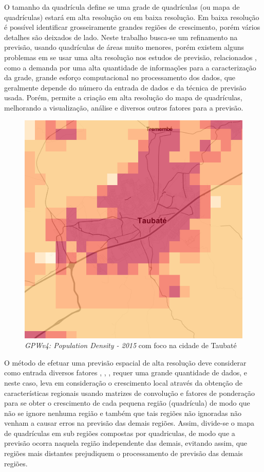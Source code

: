 O tamanho da quadrícula define se uma grade de quadrículas (ou mapa de quadrículas) estará em alta resolução ou em baixa resolução. Em baixa resolução é possível identificar grosseiramente grandes regiões de crescimento, porém vários detalhes são deixados de lado. Neste trabalho busca-se um refinamento na previsão, usando quadrículas de áreas muito menores, porém existem alguns problemas em se usar uma alta resolução nos estudos de previsão, relacionados \cite{longley1996spatial}, como a demanda por uma alta quantidade de informações para a caracterização da grade, grande esforço computacional no processamento dos dados, que geralmente depende do número da entrada de dados e da técnica de previsão usada. Porém, permite a criação em alta resolução do mapa de quadrículas, melhorando a visualização, análise e diversos outros fatores para a previsão. 

\begin{figure}[h]
	\centering	
	\includegraphics[scale=1]{Figuras/sedacGPWv4.png}
	\caption{\emph{GPWv4: Population Density - 2015} com foco na cidade de Taubaté }
	\label{fig:sedacGPWv4}
\end{figure}

O método de efetuar uma previsão espacial de alta resolução deve considerar como entrada diversos fatores \cite{arango1993mthesis}, \cite{arango2004spatial}, \cite{willis2002spatial}, requer uma grande quantidade de dados, e neste caso, leva em consideração o crescimento local através da obtenção de características regionais usando matrizes de convolução e fatores de ponderação para se obter o crescimento de cada pequena região (quadrícula) de modo que não se ignore nenhuma região e também que tais regiões não ignoradas não venham a causar erros na previsão das demais regiões. Assim, divide-se o mapa de quadrículas em sub regiões compostas por quadriculas, de modo que a previsão ocorra naquela região independente das demais, evitando assim, que regiões mais distantes prejudiquem o processamento de previsão das demais regiões.


